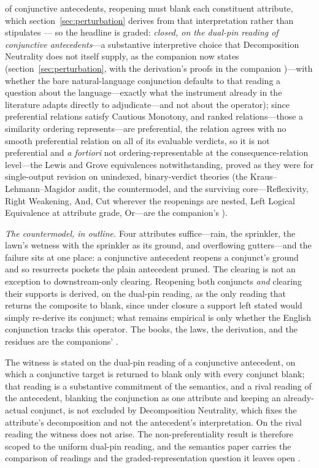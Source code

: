 \documentclass[11pt]{article}
\theoremstyle{definition}
\begin{document}
of conjunctive antecedents, reopening must blank each constituent attribute, which section~\ref{sec:perturbation} derives from that interpretation rather than stipulates --- so the headline is graded: \emph{closed, on the dual-pin reading of conjunctive antecedents}---a substantive interpretive choice that Decomposition Neutrality does not itself supply, as the companion now states (section~\ref{sec:perturbation}, with the derivation's proofs in the companion \cite{Aethus})---with whether the bare natural-language conjunction defaults to that reading a question about the language---exactly what the instrument already in the literature \cite{ciardelli2018} adapts directly to adjudicate---and not about the operator); since preferential relations satisfy Cautious Monotony, and ranked relations---those a similarity ordering represents---are preferential, the relation agrees with no smooth preferential relation on all of its evaluable verdicts, so it is not preferential and \emph{a fortiori} not ordering-representable at the consequence-relation level---the Lewis and Grove equivalences notwithstanding, proved as they were for single-output revision on unindexed, binary-verdict theories (the Kraus--Lehmann--Magidor audit, the countermodel, and the surviving core---Reflexivity, Right Weakening, And, Cut wherever the reopenings are nested, Left Logical Equivalence at attribute grade, Or---are the companion's \cite{Aethus}).

\noindent\textit{The countermodel, in outline.} Four attributes suffice---rain, the sprinkler, the lawn's wetness with the sprinkler as its ground, and overflowing gutters---and the failure sits at one place: a conjunctive antecedent reopens a conjunct's ground and so resurrects pockets the plain antecedent pruned. The clearing is not an exception to downstream-only clearing. Reopening both conjuncts \emph{and} clearing their supports is derived, on the dual-pin reading, as the only reading that returns the composite to blank, since under closure a support left stated would simply re-derive its conjunct; what remains empirical is only whether the English conjunction tracks this operator. The books, the laws, the derivation, and the residues are the companions' \cite{Aethus, AethusSemantics}.

The witness is stated on the dual-pin reading of a conjunctive antecedent, on which a conjunctive target is returned to blank only with every conjunct blank; that reading is a substantive commitment of the semantics, and a rival reading of the antecedent, blanking the conjunction as one attribute and keeping an already-actual conjunct, is not excluded by Decomposition Neutrality, which fixes the attribute's decomposition and not the antecedent's interpretation. On the rival reading the witness does not arise. The non-preferentiality result is therefore scoped to the uniform dual-pin reading, and the semantics paper carries the comparison of readings and the graded-representation question it leaves open \cite{AethusSemantics}.
\end{document}
